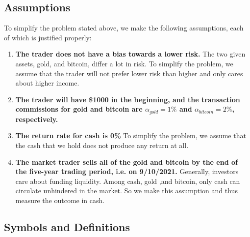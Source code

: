 \documentclass[12pt,a4paper]{article}
\begin{document}
\begin{spacing}{1.2}
\subsection{Assumptions}
To simplify the problem stated above, we make the following assumptions, each of which is justified properly: 
\begin{enumerate}
	
	\item \textbf{The trader does not have a bias towards a lower risk.} The two given assets, gold, and bitcoin, differ a lot in risk. To simplify the problem, we assume that the trader will not prefer lower risk than higher and only cares about higher income.
	
	\item \textbf{The trader will have \$1000 in the beginning, and the transaction commissions for gold and bitcoin are $\alpha_{gold}=1\%$ and $\alpha_{bitcoin}=2\%$, respectively.}

	\item \textbf{The return rate for cash is 0\%} To simplify the problem, we assume that the cash that we hold does not produce any return at all.

	\item \textbf{The market trader sells all of the gold and bitcoin by the end of the five-year trading period, i.e. on 9/10/2021.} Generally, investors care about funding liquidity. Among cash, gold ,and bitcoin, only cash can circulate unhindered in the market. So we make this assumption and thus measure the outcome in cash.
	
\end{enumerate}


\subsection{Symbols and Definitions}


\end{spacing}
\end{document}
